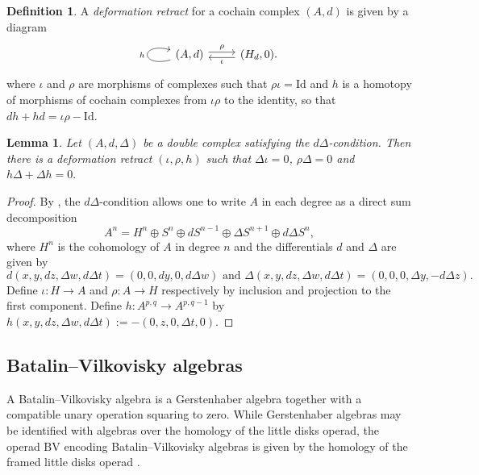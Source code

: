\documentclass[a4paper]{amsart}
\newtheorem{lemm}[theo]{Lemma}
\theoremstyle{definition}
\newtheorem{defi}[theo]{Definition}
\theoremstyle{theorem}
\newcommand{\BV}{{\mathrm{BV}}}
\newcommand{\Id}{\mathrm{Id}}
\begin{document}
\begin{defi} A \textit{deformation retract} for a cochain complex $(A,d)$ is given by a diagram
\[
\begin{tikzcd}[ampersand replacement = \&]
(A,d) \arrow[r, rightarrow, shift left, "\rho"] \arrow[r, shift right, leftarrow, "\iota" swap] \arrow[loop left, "h"] \& (H_d,0).
\end{tikzcd}
\]
where $\iota$ and $\rho$ are morphisms of complexes
such that 
$\rho \iota=\mathrm{Id}$
and $h$ is a homotopy of morphisms of cochain complexes from $\iota\rho$ to the identity, so that $dh+hd=\iota\rho-\Id$.
\end{defi}


\begin{lemm}\label{HTData}Let $(A,d,\Delta)$ be a double complex satisfying the $d\Delta$-condition. Then
there is a deformation retract $(\iota,\rho,h)$
such that $\Delta \iota=0$, $\rho\Delta=0$ and $h\Delta+\Delta h=0.$
\end{lemm}
\begin{proof}
By  \cite[Proposition 3.17]{DGMS}, the
 $d\Delta$-condition allows one to write $A$
in each degree as a direct sum decomposition 
\[A^{n}=H^{n}\oplus S^{n}\oplus dS^{n-1}\oplus \Delta S^{n+1}\oplus d\Delta S^{n},\]
where $H^{n}$ is the cohomology of $A$ in degree $n$ and the differentials $d$ and $\Delta$ are given by
\[d(x,y,dz,\Delta w,d\Delta t)=(0,0,dy,0,d\Delta w)\text{ and }\Delta(x,y,dz,\Delta w,d\Delta t)=(0,0,0,\Delta y,-d\Delta z).\]
Define $\iota:H\to A$ and $\rho:A\to H$ respectively by inclusion and projection to the first component. 
Define $h:A^{p,q}\to A^{p,q-1}$ by 
$h(x,y,dz,\Delta w,d\Delta t):=-(0,z,0,\Delta t,0).$
\end{proof}






















\subsection{Batalin--Vilkovisky algebras}A Batalin--Vilkovisky algebra is a Gerstenhaber algebra together with a compatible unary operation squaring to zero.
While Gerstenhaber algebras may be identified with algebras over the homology of the little disks operad, the operad $\BV$ encoding
Batalin--Vilkovisky algebras is given by the homology of the framed little disks operad \cite{Getzler2D}.
\end{document}
